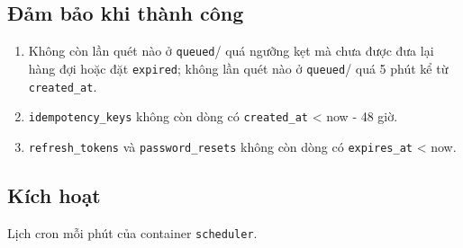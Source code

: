 \subsection{Đảm bảo khi thành công}
\begin{enumerate}
\item Không còn lần quét nào ở {\small\texttt{queued}}/ quá ngưỡng kẹt mà chưa được đưa lại hàng đợi hoặc đặt {\small\texttt{expired}}; không lần quét nào ở {\small\texttt{queued}}/ quá 5 phút kể từ {\small\texttt{created\_\allowbreak{}\allowbreak{}at}}.
\item {\small\texttt{idempotency\_\allowbreak{}\allowbreak{}keys}} không còn dòng có {\small\texttt{created\_\allowbreak{}\allowbreak{}at}} < now - 48 giờ.
\item {\small\texttt{refresh\_\allowbreak{}\allowbreak{}tokens}} và {\small\texttt{password\_\allowbreak{}\allowbreak{}resets}} không còn dòng có {\small\texttt{expires\_\allowbreak{}\allowbreak{}at}} < now.
\end{enumerate}
\subsection{Kích hoạt}
Lịch cron mỗi phút của container {\small\texttt{scheduler}}.

